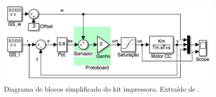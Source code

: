 \begin{figure}[ht]
	\begin{center}
		\includegraphics[width=\textwidth,keepaspectratio]{img/kit_blocos.png}
       \caption{Diagrama de blocos simplificado do kit impressora. Extraído de \cite{CDIN:Roteiro1}.}
       \label{kit_modelagem}
	\end{center}
\end{figure}
